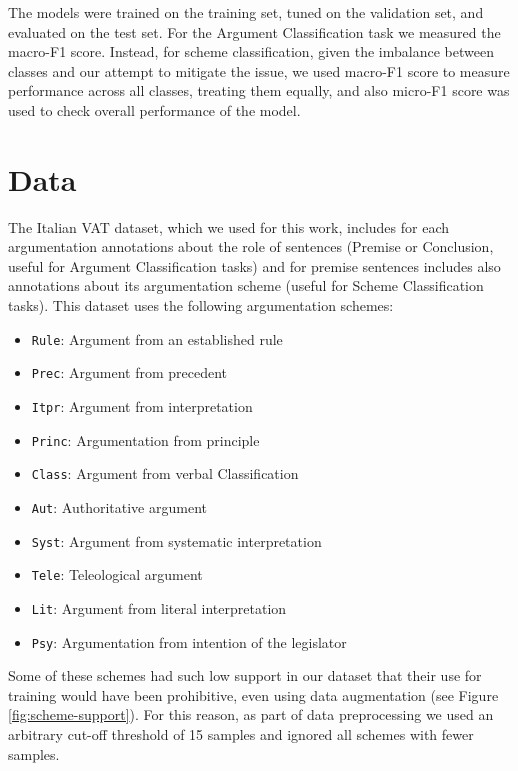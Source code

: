 \documentclass[11pt]{article}
\begin{document}
The models were trained on the training set, tuned on the validation set, and evaluated on the test set. For the Argument Classification task we measured the macro-F1 score. Instead, for scheme classification, given the imbalance between classes and our attempt to mitigate the issue, we used macro-F1 score to measure performance across all classes, treating them equally, and also micro-F1 score was used to check overall performance of the model.
\section{Data}
\label{sec:data}


The Italian VAT dataset, which we used for this work, includes for each argumentation annotations about the role of sentences (Premise or Conclusion, useful for Argument Classification tasks) and for premise sentences includes also annotations about its argumentation scheme (useful for Scheme Classification tasks).
This dataset uses the following argumentation schemes:\cite{grundler-etal-2022-detecting}\cite{adele-guidelines}
\begin{itemize}
    \item \lstinline|Rule|: Argument from an established rule
    \item \lstinline|Prec|: Argument from precedent
    \item \lstinline|Itpr|: Argument from interpretation
    \item \lstinline|Princ|: Argumentation from principle
    \item \lstinline|Class|: Argument from verbal Classification
    \item \lstinline|Aut|: Authoritative argument
    \item \lstinline|Syst|: Argument from systematic interpretation
    \item \lstinline|Tele|: Teleological argument
    \item \lstinline|Lit|: Argument from literal interpretation
    \item \lstinline|Psy|: Argumentation from intention of the legislator
\end{itemize}
Some of these schemes had such low support in our dataset that their use for training would have been prohibitive, even using data augmentation (see Figure \ref{fig:scheme-support}).
For this reason, as part of data preprocessing we used an arbitrary cut-off threshold of 15 samples and ignored all schemes with fewer samples.
\end{document}
